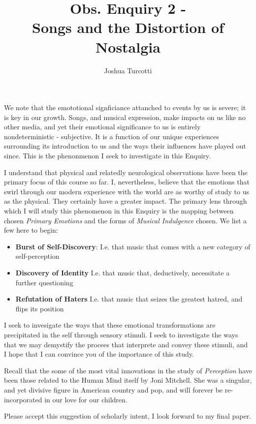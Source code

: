 \documentclass{article}
\title{Obs. Enquiry 2 - \\Songs and the Distortion of Nostalgia}
\author{Joshua Turcotti}
\begin{document}
\maketitle

We note that the emototional signficiance attanched to events by us is severe; it is key in our growth. Songs, and musical expression, make impacts on us like no other media, and yet their emotional significance to us is entirely nondeterministic - subjective. It is a function of our unique experiences surrounding its introduction to us and the ways their influences have played out since. This is the phenonmenon I seek to investigate in this Enquiry.

I understand that physical and relatedly neurological observations have been the primary focus of this course so far. I, nevertheless, believe that the emotions that swirl through our modern experience with the world are as worthy of study to us as the physical. They certainly have a greater impact. The primary lens through which I will study this phenomenon in this Enquiry is the mapping between chosen \textit{Primary Emotions} and the forms of \textit{Musical Indulgence} chosen. We list a few here to begin:
\begin{itemize}
\item \label{1} \textbf{Burst of Self-Discovery}: I.e. that music that comes with a new category of self-perception
\item \label{2} \textbf{Discovery of Identity} I.e. that music that, deductively, necessitate a further questioning
\item \label{3} \textbf{Refutation of Haters} I.e. that music that seizes the greatest hatred, and flips its position
\end{itemize}
I seek to invesigate the ways that these emotional transformations are precipitated in the self through sensory stimuli. I seek to investigate the ways that we may demystify the procees that interprete and convey these stimuli, and I hope that I can convince you of the importance of this study.

Recall that the some of the most vital innovations in the study of \textit{Perception} have been those related to the Human Mind itself by Joni Mitchell. She was a singular, and yet divisive figure in American country and pop, and will forever be re-incorporated in our love for our children.

Please accept this suggestion of scholarly intent, I look forward to my final paper.
\end{document}
